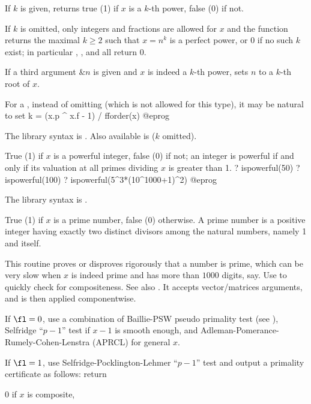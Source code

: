 \label{se:ispower}
If $k$ is given, returns true (1) if $x$ is a $k$-th power, false
(0) if not.

If $k$ is omitted, only integers and fractions are allowed for $x$ and the
function returns the maximal $k \geq 2$ such that $x = n^k$ is a perfect
power, or 0 if no such $k$ exist; in particular ,
, and  all return $0$.

If a third argument $\&n$ is given and $x$ is indeed a $k$-th power, sets
$n$ to a $k$-th root of $x$.

\noindent For a  , instead of omitting  (which is
not allowed for this type), it may be natural to set
\bprog
k = (x.p ^ x.f - 1) / fforder(x)
@eprog

The library syntax is .
Also available is
 ($k$ omitted).

\label{se:ispowerful}
True (1) if $x$ is a powerful integer, false (0) if not;
an integer is powerful if and only if its valuation at all primes dividing
$x$ is greater than 1.
\bprog
? ispowerful(50)
? ispowerful(100)
? ispowerful(5^3*(10^1000+1)^2)
@eprog

The library syntax is .

\label{se:isprime}
True (1) if $x$ is a prime
number, false (0) otherwise. A prime number is a positive integer having
exactly two distinct divisors among the natural numbers, namely 1 and
itself.

This routine proves or disproves rigorously that a number is prime, which can
be very slow when $x$ is indeed prime and has more than $1000$ digits, say.
Use  to quickly check for compositeness. See also
. It accepts vector/matrices arguments, and is then applied
componentwise.

If $\fl=0$, use a combination of Baillie-PSW pseudo primality test (see
), Selfridge ``$p-1$'' test if $x-1$ is smooth enough, and
Adleman-Pomerance-Rumely-Cohen-Lenstra (APRCL) for general $x$.

If $\fl=1$, use Selfridge-Pocklington-Lehmer ``$p-1$'' test and output a
primality certificate as follows: return

\item 0 if $x$ is composite,

